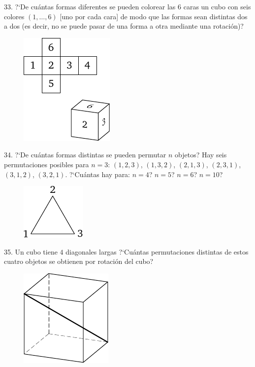 \begin{problem}{33.}
	?`De cu\'antas formas diferentes se pueden colorear las 6 caras un cubo con seis colores $(1,\dotsc,6)$ [uno por cada cara]
	de modo que las formas sean distintas dos a dos (es decir, no se puede pasar de una forma a otra mediante una rotaci\'on)?
	\begin{figure}
		\includegraphics{resources/taskbook-17}
	\end{figure}
\end{problem}

\begin{problem}{34.}
	?`De cu\'antas formas distintas se pueden permutar $n$ objetos? Hay seis permutaciones posibles para $n=3$: $(1,2,3)$,
$(1,3,2)$, $(2,1,3)$, $(2,3,1)$, $(3,1,2)$, $(3,2,1)$. ?`Cu\'antas hay para: $n=4$? $n=5$? $n=6$? $n=10$?
	\begin{figure}
		\includegraphics{resources/taskbook-18}
	\end{figure}
\end{problem}

\begin{problem}{35.}
	Un cubo tiene $4$ diagonales largas ?`Cu\'antas permutaciones distintas de estos cuatro objetos se obtienen por rotaci\'on del cubo?
	\begin{figure}
		\includegraphics{resources/taskbook-19}
	\end{figure}
\end{problem}

